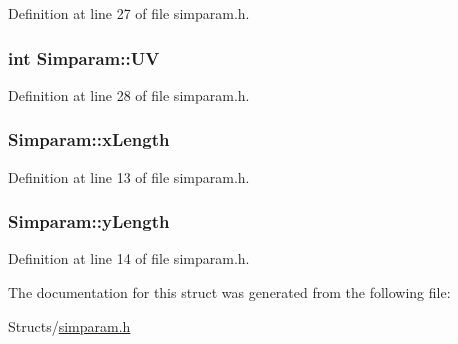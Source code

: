 Definition at line 27 of file simparam.\-h.

\hypertarget{struct_simparam_a2d14ee995484c84928cd341ce35079b8}{
\subsubsection[{U\-V}]{\setlength{\rightskip}{0pt plus 5cm}int Simparam\-::\-U\-V}}\label{d6/d1d/struct_simparam_a2d14ee995484c84928cd341ce35079b8}


Definition at line 28 of file simparam.\-h.

\hypertarget{struct_simparam_a1e96889e108dde9f48978aa8f7c9027c}{
\subsubsection[{x\-Length}]{ Simparam\-::x\-Length}}\label{d6/d1d/struct_simparam_a1e96889e108dde9f48978aa8f7c9027c}


Definition at line 13 of file simparam.\-h.

\hypertarget{struct_simparam_a065ce904080ea0361eae98124c86ffab}{
\subsubsection[{y\-Length}]{ Simparam\-::y\-Length}}\label{d6/d1d/struct_simparam_a065ce904080ea0361eae98124c86ffab}


Definition at line 14 of file simparam.\-h.



The documentation for this struct was generated from the following file\-:\begin{DoxyCompactItemize}
\item 
Structs/\hyperlink{simparam_8h}{simparam.\-h}\end{DoxyCompactItemize}
